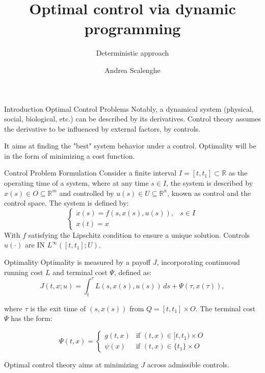 \documentclass[10pt, compress]{beamer}
\title{Optimal control via dynamic programming}
\subtitle{Deterministic approach}
\author{Andrea Scalenghe}
\institute{Tesi magistrale}
\newcommand{\R}{\mathbb{R}}
\begin{document}
\maketitle

\begin{frame}{Introduction Optimal Control Problems}
    Notably, a dynamical system (physical, social, biological, etc.) can be described by its derivatives. Control theory assumes the derivative to be influenced by external factors, by controls. 

    It aims at finding the "best" system behavior under a control. Optimality will be in the form of minimizing a cost function.
    
\end{frame}

\begin{frame}{Control Problem Formulation}
    Consider a finite interval \(I=[t,t_1]\subset\R\) as the operating time of a system, where at any time \(s\in I\), the system is described by \(x(s)\in O\subseteq \R^m\) and controlled by \(u(s)\in U\subseteq\R^n\), known as control and the control space. The system is defined by:
    \begin{equation*}
        \begin{cases}
            \dot{x}(s) = f(s,x(s),u(s)), & s\in I \\
            x(t) = x
        \end{cases}
    \end{equation*}
    With \(f\) satisfying the Lipschitz condition to ensure a unique solution. Controls \(u(\cdot)\) are IN \(L^{\infty}\left([t,t_1];U\right)\).
\end{frame}

\begin{frame}{Optimality}
    Optimality is measured by a payoff \(J\), incorporating continuoud running cost \(L\) and terminal cost \(\Psi\), defined as:
    \[
        J(t,x;u) = \int_t^{\tau}L(s,x(s),u(s)) \,ds + \Psi(\tau, x(\tau)),
    \]

    where $\tau$ is the exit time of $(s,x(s))$ from $Q=[t,t_1]\times O$. The terminal cost $\Psi$ has the form:
    
    \[\Psi(t,x) = \begin{cases}
        g(t,x) & \text{if } (t,x)\in [t,t_1)\times O \\
        \psi(x) & \text{if } (t,x)\in \{t_1\}\times O  
    \end{cases}\] 

    Optimal control theory aims at minimizing \(J\) across admissible controls.
\end{frame}
\end{document}
